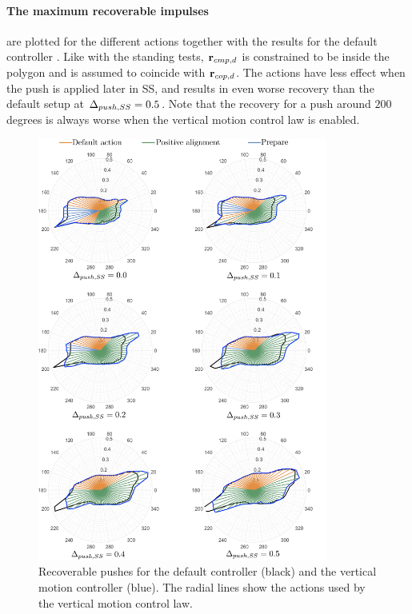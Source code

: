 \paragraph{The maximum recoverable impulses} are plotted for the different actions together with the results for the default controller . Like with the standing tests, $\mathbf{r}_{cmp,d}$ is constrained to be inside the polygon and is assumed to coincide with $\mathbf{r}_{cop,d}$. The actions have less effect when the push is applied later in \ac{SS}, and results in even worse recovery than the default setup at $\Delta_{push,SS}=0.5$. Note that the recovery for a push around $200$ degrees is always worse when the vertical motion control law is enabled.
\begin{figure}
     \centering
        \includegraphics[width=0.85\textwidth]{STYLESTUFF/rounActions.png}
    \caption{Recoverable pushes for the default controller (black) and the vertical motion controller (blue). The radial lines show the actions used by the vertical motion control law.}
    \label{fig:roundPushActions}
\end{figure}

